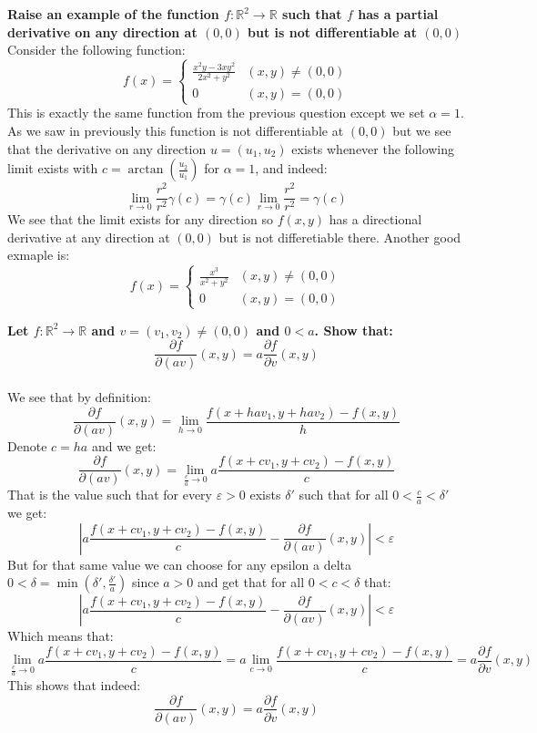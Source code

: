 \documentclass{article}
\theoremstyle{plain}
\newcommand{\R}{\mathbb{R}}
\begin{document}
	\textbf{Raise an example of the function $f\colon \R^2\to\R$ such that 
	$f$ has a partial derivative on any direction at $(0,0)$ but is not 
	differentiable at $(0,0)$} \\
	Consider the following function:
	\[
		f(x) = 
		\begin{cases}
			\frac{x^2y-3xy^2}{2x^2+y^2} & (x,y) \neq (0,0) \\
			0 & (x,y) = (0,0)
		\end{cases}
	\]
	This is exactly the same function from the previous question except
	we set $\alpha=1$. As we saw in previously this function is
	not differentiable at $(0,0)$ but we see that
	the derivative on any direction $u=(u_1,u_2)$ exists whenever
	the following limit exists with $c=\arctan(\frac{u_2}{u_1})$ for
	$\alpha = 1$, and indeed:
	\[
		\lim_{r\to 0}{\frac{r^2}{r^{2}}\gamma(c)} = 
		\gamma(c)\lim_{r\to 0}{\frac{r^2}{r^{2}}} = \gamma(c)
	\]
	We see that the limit exists for any direction so $f(x,y)$ has a directional
	derivative at any direction at $(0,0)$ but is not differetiable there.
	Another good exmaple is:
	\[
		f(x) = 
		\begin{cases}
			\frac{x^3}{x^2+y^2} & (x,y) \neq (0,0) \\
			0 & (x,y) = (0,0)
		\end{cases}
	\]
	
	\newpage
	
	\textbf{Let $f\colon\R^2\to\R$ and $v=(v_1,v_2)\neq(0,0)$ and $0 < a$.
	Show that:
	\[
		\frac{\partial f}{\partial (av)}(x,y) = 
	    a \frac{\partial f}{\partial v}(x,y)
	\]} \\
	We see that by definition:
	\[
		\frac{\partial f}{\partial (av)}(x,y) = 
		\lim_{h\to 0}{\frac{f(x+hav_1,y+hav_2)-f(x,y)}{h}}
	\]
	Denote $c=ha$ and we get:
	\[
		\frac{\partial f}{\partial (av)}(x,y) = 
		\lim_{\frac{c}{a}\to 0}{a\frac{f(x+cv_1,y+cv_2)-f(x,y)}{c}}
	\]
	That is the value such that for every $\varepsilon > 0$ exists $\delta'$
	such that for all $0 < \frac{c}{a} < \delta'$ we get:
	\[
		\left\vert a\frac{f(x+cv_1,y+cv_2)-f(x,y)}{c} - 
		\frac{\partial f}{\partial (av)}(x,y) \right\vert < \varepsilon
	\]
	But for that same value we can choose for any epsilon a delta
	$0 < \delta=\min(\delta',\frac{\delta'}{a})$ since $a > 0$ and get that
	for all $0 < c < \delta$ that:
	\[
		\left\vert a\frac{f(x+cv_1,y+cv_2)-f(x,y)}{c} - 
		\frac{\partial f}{\partial (av)}(x,y) \right\vert < \varepsilon
	\]
	Which means that:
	\[
		\lim_{\frac{c}{a}\to 0}{a\frac{f(x+cv_1,y+cv_2)-f(x,y)}{c}} = 
		a\lim_{c\to 0}{\frac{f(x+cv_1,y+cv_2)-f(x,y)}{c}} = 
		a \frac{\partial f}{\partial v}(x,y)
	\]
	This shows that indeed:
	\[
		\boxed{\frac{\partial f}{\partial (av)}(x,y) = 
	    a \frac{\partial f}{\partial v}(x,y)}
	\]
	
\end{document}
